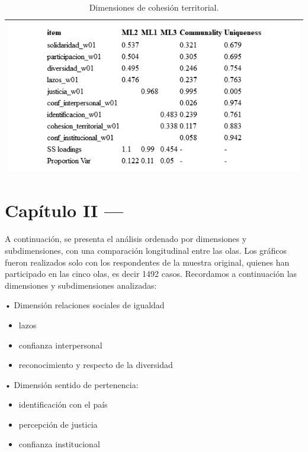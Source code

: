 \documentclass[
  12pt,
]{book}
\providecommand{\tightlist}{%
  \setlength{\itemsep}{0pt}\setlength{\parskip}{0pt}}
\begin{document}
\begin{longtable}[]{@{}l@{}}
\caption{\label{tab:cohesion-social-fa}Dimensiones de cohesión territorial.}\tabularnewline
\toprule
\endhead
\includegraphics[width=8.33333in,height=\textheight]{output/tables/cohesion_social_fa.png}\tabularnewline
\bottomrule
\end{longtable}

\hypertarget{capuxedtulo-ii}{%
\chapter{Capítulo II ---}\label{capuxedtulo-ii}}

A continuación, se presenta el análisis ordenado por dimensiones y subdimensiones, con una comparación longitudinal entre las olas. Los gráficos fueron realizados solo con los respondentes de la muestra original, quienes han participado en las cinco olas, es decir 1492 casos.
Recordamos a continuación las dimensiones y subdimensiones analizadas:

• Dimensión relaciones sociales de igualdad

\begin{itemize}
\tightlist
\item
  lazos
\item
  confianza interpersonal
\item
  reconocimiento y respecto de la diversidad
\end{itemize}

• Dimensión sentido de pertenencia:

\begin{itemize}
\tightlist
\item
  identificación con el país
\item
  percepción de justicia
\item
  confianza institucional
\end{itemize}
\end{document}

